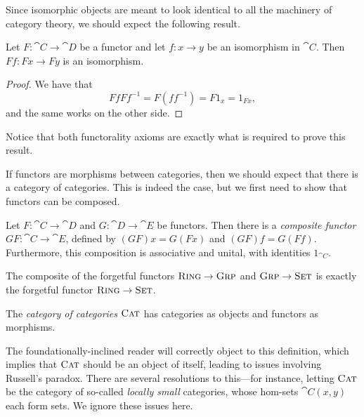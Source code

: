 Since isomorphic objects are meant to look identical to all the machinery of
category theory, we should expect the following result.

\begin{prop}\label{thm:functors-preserve-iso}
  Let $F: \cat{C}\to\cat{D}$ be a functor and let $f: x\to y$ be an isomorphism
  in $\cat{C}$. Then $Ff: Fx\to Fy$ is an isomorphism.
\end{prop}

\begin{proof}
  We have that \[
    FfFf^{-1} = F(ff^{-1}) = F1_x = 1_{Fx},
  \]and the same works on the other side.
\end{proof}

Notice that both functorality axioms are exactly what is required to prove this
result.

\vspace{1em}

If functors are morphisms between categories, then we should expect that there
is a category of categories. This is indeed the case, but we first need to show
that functors can be composed.

\begin{prop}
  Let $F: \cat{C}\to\cat{D}$ and $G: \cat{D}\to\cat{E}$ be functors. Then there
  is a \emph{composite functor} $GF: \cat{C}\to\cat{E}$, defined by $(GF)x =
  G(Fx)$ and $(GF)f = G(Ff)$. Furthermore, this composition is associative and
  unital, with identities $1_{\cat{C}}$.
\end{prop}

\begin{ex}
  The composite of the forgetful functors ${\textsc{\text{Ring}}}\to{\textsc{\text{Grp}}}$ and
  ${\textsc{\text{Grp}}}\to{\textsc{\text{Set}}}$ is exactly the forgetful functor
  ${\textsc{\text{Ring}}}\to{\textsc{\text{Set}}}$.
\end{ex}

\begin{dfn}
  The \emph{category of categories} ${\textsc{\text{Cat}}}$ has categories as objects and
  functors as morphisms.
\end{dfn}

The foundationally-inclined reader will correctly object to this definition,
which implies that ${\textsc{\text{Cat}}}$ should be an object of itself, leading to issues
involving Russell's paradox. There are several resolutions to this---for
instance, letting ${\textsc{\text{Cat}}}$ be the category of so-called \emph{locally small}
categories, whose hom-sets $\cat{C}(x, y)$ each form sets. We ignore these
issues here.


